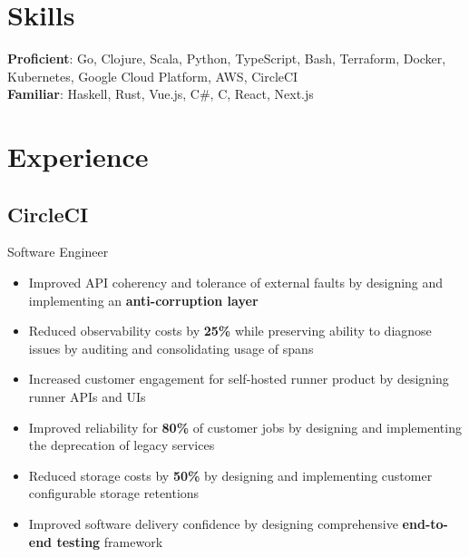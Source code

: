 \documentclass[letterpaper,12pt,oneside]{article}
\begin{document}
\section*{Skills}
\textbf{Proficient}:
Go, Clojure, Scala, Python, TypeScript, Bash, Terraform, Docker, Kubernetes,
Google Cloud Platform, AWS, CircleCI \\
\textbf{Familiar}:
Haskell, Rust, Vue.js, C\#, C, React, Next.js

\section*{Experience}
\subsection*{CircleCI \hfill {}}
Software Engineer
\begin{itemize}
    \setlength\itemsep{0em}
    \item Improved API coherency and tolerance of external faults by designing and implementing an \textbf{anti-corruption layer}
    \item Reduced observability costs by \textbf{25\%} while preserving ability to diagnose issues by auditing and consolidating usage of spans
    \item Increased customer engagement for self-hosted runner product by designing runner APIs and UIs
    \item Improved reliability for \textbf{80\%} of customer jobs by designing and implementing the deprecation of legacy services
    \item Reduced storage costs by \textbf{50\%} by designing and implementing customer configurable storage retentions
    \item Improved software delivery confidence by designing comprehensive \textbf{end-to-end testing} framework
\end{itemize}
\end{document}

